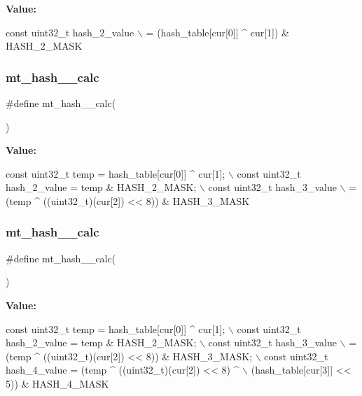 {\bfseries Value\+:}
\begin{DoxyCode}
\textcolor{keyword}{const} uint32\_t hash\_2\_value \(\backslash\)
                        = (hash\_table[cur[0]] ^ cur[1]) & HASH\_2\_MASK
\end{DoxyCode}
\mbox{\label{lz__encoder__hash_8h_ad64b3768fc4a0674490b9c1bb369f285}} 
\subsubsection{mt\+\_\+hash\+\_\+\_\+calc}
{\footnotesize\ttfamily \#define mt\+\_\+hash\+\_\+\_\+calc(\begin{DoxyParamCaption}{ }\end{DoxyParamCaption})}

{\bfseries Value\+:}
\begin{DoxyCode}
\textcolor{keyword}{const} uint32\_t temp = hash\_table[cur[0]] ^ cur[1]; \(\backslash\)
        const uint32\_t hash\_2\_value = temp & HASH\_2\_MASK; \(\backslash\)
        const uint32\_t hash\_3\_value \(\backslash\)
                        = (temp ^ ((uint32\_t)(cur[2]) << 8)) & HASH\_3\_MASK
\end{DoxyCode}
\mbox{\label{lz__encoder__hash_8h_a8061231e74e4a3c667ea105a1b1c87eb}} 
\subsubsection{mt\+\_\+hash\+\_\+\_\+calc}
{\footnotesize\ttfamily \#define mt\+\_\+hash\+\_\+\_\+calc(\begin{DoxyParamCaption}{ }\end{DoxyParamCaption})}

{\bfseries Value\+:}
\begin{DoxyCode}
\textcolor{keyword}{const} uint32\_t temp = hash\_table[cur[0]] ^ cur[1]; \(\backslash\)
        const uint32\_t hash\_2\_value = temp & HASH\_2\_MASK; \(\backslash\)
        const uint32\_t hash\_3\_value \(\backslash\)
                        = (temp ^ ((uint32\_t)(cur[2]) << 8)) & HASH\_3\_MASK; \(\backslash\)
        const uint32\_t hash\_4\_value = (temp ^ ((uint32\_t)(cur[2]) << 8) ^ \(\backslash\)
                        (hash\_table[cur[3]] << 5)) & HASH\_4\_MASK
\end{DoxyCode}
